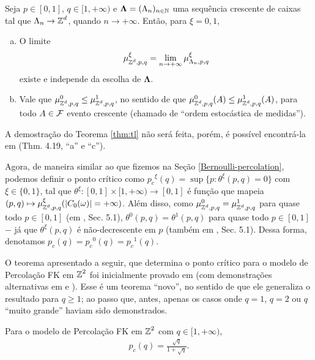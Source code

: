 \begin{mythm} \label{thm:tl}
	Seja $p \in [0, 1]$, $q \in [1, +\infty)$ e $\mathbf{\Lambda} = (\Lambda_n)_{n \in \operatorname{\mathbb{N}}}$ uma sequência crescente de caixas tal que $\Lambda_n \rightarrow \operatorname{\mathbb{Z}}^d$, quando $n \rightarrow +\infty$. Então, para $\xi = 0, 1$, 
	\begin{enumerate}[a.]
		\item O limite
		\begin{align*}
		\mu_{\operatorname{\mathbb{Z}}^d, p, q}^{\xi} = \lim_{n \rightarrow +\infty} \mu_{\Lambda_n, p, q}^{\xi}
		\end{align*}
		existe e independe da escolha de $\mathbf{\Lambda}$.
		\item Vale que $\mu_{\operatorname{\mathbb{Z}}^d, p, q}^0 \leq \mu_{\operatorname{\mathbb{Z}}^d, p, q}^1$, no sentido de que $\mu_{\operatorname{\mathbb{Z}}^d, p, q}^0(A) \leq \mu_{\operatorname{\mathbb{Z}}^d, p, q}^1(A)$, para todo $A \in \operatorname{\mathcal{F}}$ evento crescente (chamado de ``ordem estocástica de medidas'').
	\end{enumerate}
\end{mythm}

A demostração do Teorema \ref{thm:tl} não será feita, porém, é possível encontrá-la em  \cite{grimmett2004random} (Thm. 4.19, ``a'' e ``c'').

Agora, de maneira similar ao que fizemos na Seção \ref{Bernoulli-percolation}, podemos definir o ponto crítico como ${p_c}^{\xi}(q) = \sup\{p: \theta^{\xi}(p, q) = 0\}$ com $\xi \in \{0, 1\}$, tal que $\theta^{\xi}:[0, 1] \times [1, +\infty) \longrightarrow [0, 1]$ é função que mapeia $(p, q) \mapsto \mu_{\operatorname{\mathbb{Z}}^d, p, q}^{\xi}(|C_0(\omega)| = +\infty)$. Além disso, como $\mu_{\operatorname{\mathbb{Z}}^d, p, q}^0 = \mu_{\operatorname{\mathbb{Z}}^d, p, q}^1$ para quase todo $p \in [0, 1]$ (em \cite{grimmett2004random}, Sec. 5.1), $\theta^0(p, q) = \theta^1(p, q)$ para quase todo $p \in [0, 1]$ $-$ já que $\theta^{\xi}(p, q)$ é não-decrescente em $p$ (também em \cite{grimmett2004random}, Sec. 5.1). Dessa forma, denotamos $p_c(q) = {p_c}^0(q) = {p_c}^1(q)$.

O teorema apresentado a seguir, que determina o ponto crítico para o modelo de Percolação FK em $\operatorname{\mathbb{Z}}^2$ foi inicialmente provado em \cite{beffara2012self} (com demonstrações alternativas em \cite{duminil2016phase} e \cite{duminil2018new}). Esse é um teorema ``novo'', no sentido de que ele generaliza o resultado para $q \geq 1$; ao passo que, antes, apenas os casos onde $q = 1$, $q = 2$ ou $q$ ``muito grande'' haviam sido demonstrados.

\begin{mythm} \label{thm:pc}
	Para o modelo de Percolação FK em $\operatorname{\mathbb{Z}}^2$ com $q \in [1, +\infty)$,
	\begin{align*}
	p_c(q) = \frac{\sqrt{q}}{1 + \sqrt{q}}.
	\end{align*}
\end{mythm}

